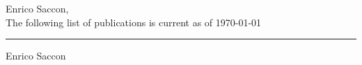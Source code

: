 \documentclass[10pt,a4paper,sans]{article}
\begin{document}
\pagestyle{empty}

\begin{center}
  \Large{Enrico Saccon,}\\
  \Large{The following list of publications is current as of \today}
\end{center}

\nocite{*}
\printbibliography[heading=none]

\vfill
\begin{flushright}
  \begin{minipage}{0.4\paperwidth}
    \centering
     \rule{.4\paperwidth}{0.4pt}
     Enrico Saccon
  \end{minipage}
\end{flushright}
\end{document}
